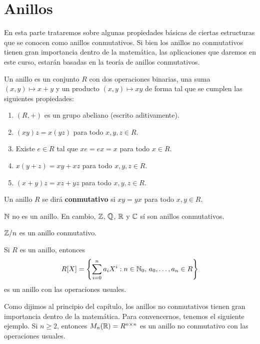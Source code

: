 \chapter{Anillos}

En esta parte trataremos sobre algunas propiedades básicas de ciertas
estructuras que se conocen como anillos conmutativos. Si bien los anillos no conmutativos tienen gran importancia dentro de la matemática, 
las aplicaciones que daremos en este curso, estarán basadas en la teoría de anillos conmutativos.

\begin{definition}
Un anillo es un conjunto $R$ con dos operaciones binarias, una suma $(x,y)\mapsto x+y$ y un producto $(x,y)\mapsto xy$ de forma tal que  
se cumplen las siguientes propiedades:
\begin{enumerate}
\item $(R,+)$ es un grupo abeliano (escrito aditivamente).
\item $(xy)z=x(yz)$ para todo $x,y,z\in R$.
\item Existe $e\in R$ tal que $xe=ex=x$ para todo $x\in R$.
\item $x(y+z)=xy+xz$ para todo $x,y,z\in R$.
\item $(x+y)z=xz+yz$ para todo $x,y,z\in R$.
\end{enumerate}
\end{definition}

\begin{definition}
Un anillo $R$ se dirá \textbf{conmutativo} si $xy=yx$ para todo $x,y\in R$.
\end{definition}

\begin{examples}
$\mathbb{N}$ no es un anillo. En cambio, 
$\mathbb{Z}$, $\mathbb{Q}$, $\mathbb{R}$ y $\mathbb{C}$ sí son anillos conmutativos.
\end{examples}

\begin{example}
$\mathbb{Z}/n$ es un anillo conmutativo.
\end{example}

\begin{example}
Si $R$ es un anillo, entonces 
\[
R[X]=\left\{\sum_{i=0}^n a_iX^i:n\in\mathbb{N}_0,\,a_0,\dots,a_n\in R\right\}
\]
es un anillo con las operaciones usuales.    	
\end{example}

Como dijimos al principio del capítulo, los anillos no conmutativos tienen gran importancia dentro de la matemática. Para convencernos, 
tenemos el siguiente ejemplo. Si $n\geq2$, entonces 
$M_n(\mathbb{R})=R^{n\times n}$ es un anillo no conmutativo con las operaciones usuales. 

